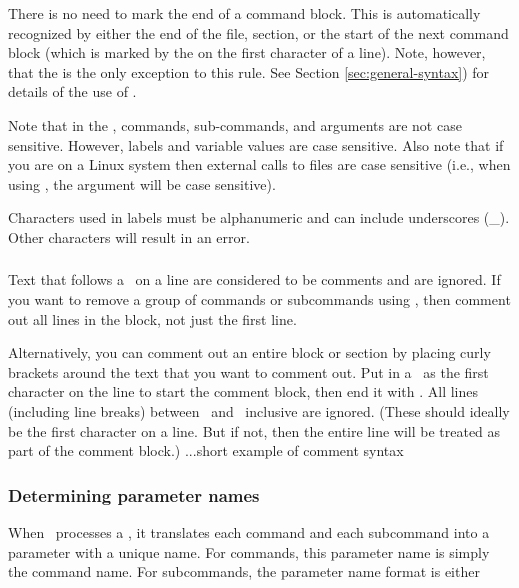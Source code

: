 There is no need to mark the end of a command block. This is automatically recognized by either the end of the file, section, or the start of the next command block (which is marked by the \command{} on the first character of a line). Note, however, that the  is the only exception to this rule. See Section \ref{sec:general-syntax}) for details of the use of . 

Note that in the \config, commands, sub-commands, and arguments are not case sensitive. However, labels and variable values are case sensitive. Also note that if you are on a Linux system then external calls to files are case sensitive (i.e., when using  , the argument  will be case sensitive). 

Characters used in labels must be alphanumeric and can include underscores (\_). Other characters will result in an error.

\subsubsection{}
\CH
Text that follows a \commentline\ on a line are considered to be comments and are ignored. If you want to remove a group of commands or subcommands using \commentline, then comment out all lines in the block, not just the first line. 

Alternatively, you can comment out an entire block or section by placing curly brackets around the text that you want to comment out. Put in a \commentstart\ as the first character on the line to start the comment block, then end it with \commentend. All lines (including line breaks) between \commentstart\ and \commentend\ inclusive are ignored. (These should ideally be the first character on a line. But if not, then the entire line will be treated as part of the comment block.)
\EX ...short example of comment syntax \EXend

\subsubsection{Determining parameter names\label{sec:parameter-names}}
\CH
When \SAM\ processes a \config, it translates each command and each subcommand into a parameter with a unique name. For commands, this parameter name is simply the command name. For subcommands, the parameter name format is either 

